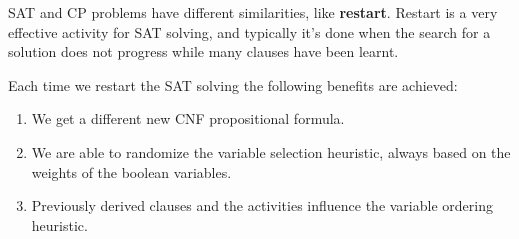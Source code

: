 SAT and CP problems have different similarities, like \textbf{restart}. Restart is a very effective activity for SAT solving, and typically it's done when 
the search for a solution does not progress while many clauses have been learnt. \vspace{7pt}

Each time we restart the SAT solving the following benefits are achieved:
\begin{enumerate}
    \renewcommand{\labelitemi}{-}
    \item We get a different new CNF propositional formula.
    \item We are able to randomize the variable selection heuristic, always based on the weights of the boolean variables.
    \item Previously derived clauses and the activities influence the variable ordering heuristic.
\end{enumerate}